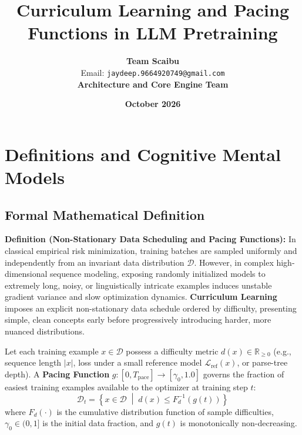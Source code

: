 \documentclass[11pt,a4paper]{article}
\title{\textbf{Curriculum Learning and Pacing Functions in LLM Pretraining}}
\author{\textbf{Team Scaibu} \\ \small Email: \texttt{jaydeep.9664920749@gmail.com} \\ \small \textbf{Architecture and Core Engine Team}}
\date{\textbf{October 2026}}
\theoremstyle{definition}
\begin{document}
\maketitle

\section{Definitions and Cognitive Mental Models}

\subsection{Formal Mathematical Definition}
\textbf{Definition (Non-Stationary Data Scheduling and Pacing Functions):}
In classical empirical risk minimization, training batches are sampled uniformly and independently from an invariant data distribution $\mathcal{D}$. However, in complex high-dimensional sequence modeling, exposing randomly initialized models to extremely long, noisy, or linguistically intricate examples induces unstable gradient variance and slow optimization dynamics. \textbf{Curriculum Learning} imposes an explicit non-stationary data schedule ordered by difficulty, presenting simple, clean concepts early before progressively introducing harder, more nuanced distributions.

Let each training example $x \in \mathcal{D}$ possess a difficulty metric $d(x) \in \mathbb{R}_{\ge 0}$ (e.g., sequence length $|x|$, loss under a small reference model $\mathcal{L}_{\text{ref}}(x)$, or parse-tree depth). A \textbf{Pacing Function} $g: [0, T_{\text{pace}}] \to [\gamma_0, 1.0]$ governs the fraction of easiest training examples available to the optimizer at training step $t$:
{\boldmath
\begin{equation}
\mathcal{D}_t = \left\{ x \in \mathcal{D} \;\middle|\; d(x) \le F_d^{-1}(g(t)) \right\}
\end{equation}
}
where $F_d(\cdot)$ is the cumulative distribution function of sample difficulties, $\gamma_0 \in (0, 1]$ is the initial data fraction, and $g(t)$ is monotonically non-decreasing.
\end{document}
